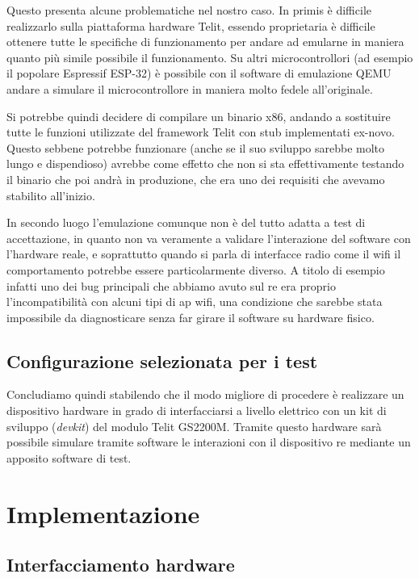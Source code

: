 \documentclass[12pt,a4paper,twoside,titlepage]{book}
\begin{document}
Questo presenta alcune problematiche nel nostro caso. In primis è difficile realizzarlo sulla piattaforma 
hardware Telit, essendo proprietaria è difficile ottenere tutte le specifiche di funzionamento per andare
ad emularne in maniera quanto più simile possibile il funzionamento. Su altri microcontrollori (ad esempio 
il popolare Espressif ESP-32) è possibile con il software di emulazione QEMU andare a simulare il microcontrollore 
in maniera molto fedele all'originale. 

Si potrebbe quindi decidere di compilare un binario x86, andando a sostituire tutte
le funzioni utilizzate del framework Telit con stub implementati ex-novo. Questo
sebbene potrebbe funzionare (anche se il suo sviluppo sarebbe molto lungo e dispendioso)
avrebbe come effetto che non si sta effettivamente testando il binario che poi andrà
in produzione, che era uno dei requisiti che avevamo stabilito all'inizio.

In secondo luogo l'emulazione comunque non è del tutto adatta a test di accettazione, in quanto non va veramente 
a validare l'interazione del software con l'hardware reale, e soprattutto quando si parla di interfacce radio 
come il \Gls{wifi} il comportamento potrebbe essere particolarmente diverso. A titolo di esempio infatti 
uno dei bug principali che abbiamo avuto sul \acrshort{re} era proprio l'incompatibilità con alcuni tipi di \acrlong{ap}
\Gls{wifi}, una condizione che sarebbe stata impossibile da diagnosticare senza far girare il software su hardware fisico.

\section{Configurazione selezionata per i test}

Concludiamo quindi stabilendo che il modo migliore di procedere è realizzare un dispositivo hardware in 
grado di interfacciarsi a livello elettrico con un kit di sviluppo (\textit{devkit}) del modulo Telit GS2200M. 
Tramite questo hardware sarà possibile simulare tramite software le interazioni con il dispositivo \acrshort{re}
mediante un apposito software di test.

\chapter{Implementazione}

\section{Interfacciamento hardware}
\end{document}
